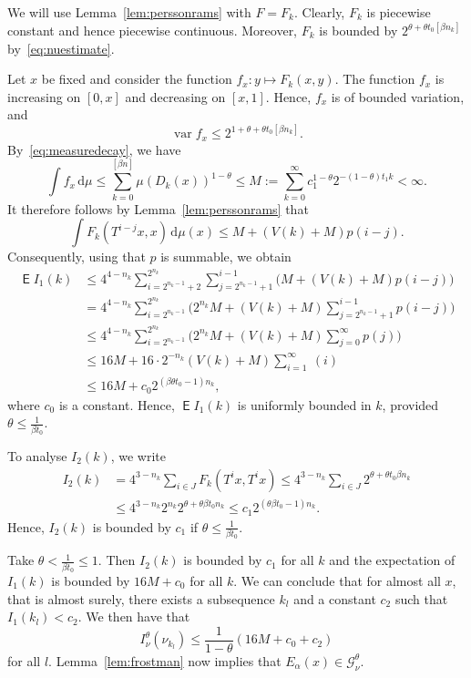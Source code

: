 \documentclass[11pt]{article}
\theoremstyle{definition}
\numberwithin{equation}{section}
\numberwithin{figure}{section}
\numberwithin{table}{section}
\DeclareMathOperator{\E}{\mathsf{E}}
\DeclareMathOperator{\var}{var}
\newcommand*{\dd}{\mathrm{d}}
\begin{document}
We will use Lemma~\ref{lem:perssonrams} with $F = F_k$. Clearly, $F_k$ is piecewise constant and hence piecewise continuous. Moreover, $F_k$ is bounded by $2^{\theta + \theta t_0 [\beta n_k]}$ by~\eqref{eq:nuestimate}.

Let $x$ be fixed and consider the function $f_x \colon y \mapsto F_k (x,y)$. The function $f_x$ is increasing on $[0,x]$ and decreasing on $[x,1]$. Hence, $f_x$ is of bounded variation, and
\[
\var f_x \leq 2^{1 + \theta + \theta t_0 [\beta n_k]}.
\]
By~\eqref{eq:measuredecay}, we have
\[
\int f_x \, \dd\mu \leq \sum_{k=0}^{[\beta n]} \mu (D_k (x))^{1-\theta} \leq M := \sum_{k=0}^\infty c_1^{1-\theta} 2^{- (1-\theta) t_1 k} < \infty.
\]
It therefore follows by Lemma~\ref{lem:perssonrams} that
\[
\int F_k (T^{i-j} x, x) \, \dd \mu (x) \leq M + (V(k) + M) p (i-j).
\]
Consequently, using that $p$ is summable, we obtain
\begin{align*}
\E I_1 (k) &\leq 4^{4-n_k} \sum_{i=2^{n_k-1}+2}^{2^{n_k}}
\sum_{j=2^{n_k-1}+1}^{i-1} \bigl(M + (V(k) + M) p (i-j) \bigr)
\\ &= 4^{4-n_k} \sum_{i=2^{n_k-1}}^{2^{n_k}} \bigl(2^{n_k} M + (V(k) + M) \sum_{j=2^{n_k-1}+1}^{i-1} p (i-j) \bigr) \\ &\leq 4^{4-n_k} \sum_{i=2^{n_k-1}}^{2^{n_k}} \bigl(2^{n_k} M + (V(k) + M)
\sum_{j=0}^\infty p (j) \bigr) \\ &\leq 16 M + 16 \cdot 2^{-n_k} (V(k) + M) \sum_{i=1}^\infty~(i) \\ & \leq 16 M + c_0 2^{(\beta
\theta t_0 -1) n_k},
\end{align*}
where $c_0$ is a constant. Hence, $\E I_1 (k)$ is uniformly bounded in $k$, provided $\theta \leq
\frac{1}{\beta t_0}$.

To analyse $I_2 (k)$, we write
\begin{align*}
I_2 (k) &= 4^{3-n_k} \sum_{i \in J} F_k (T^i x, T^i x) \leq 4^{3-n_k} \sum_{i \in J} 2^{\theta + \theta t_0 \beta n_k} \\ &\leq 4^{3-n_k} 2^{n_k} 2^{\theta + \theta \beta t_0 n_k} \leq c_1 2^{(\theta \beta t_0 - 1) n_k}.
\end{align*}
Hence, $I_2 (k)$ is bounded by $c_1$ if $\theta \leq \frac{1}{\beta t_0}$.

Take $\theta < \frac{1}{\beta t_0} \leq 1$. Then $I_2 (k)$ is bounded by $c_1$ for all $k$ and the expectation of $I_1 (k)$ is bounded by $16M + c_0$ for all $k$. We can conclude that for almost all $x$, that is almost surely, there exists a subsequence $k_l$ and a constant $c_2$ such that $I_1 (k_l) < c_2$. We then have that
\[
I_\nu^\theta (\nu_{k_l}) \leq \frac{1}{1-\theta} (16M + c_0 + c_2)
\]
for all $l$. Lemma~\ref{lem:frostman} now implies that $E_\alpha (x)
\in \mathscr{G}_\nu^\theta$.
\end{document}
